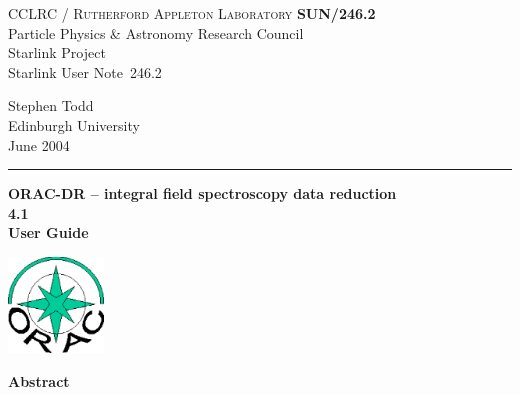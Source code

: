 \documentclass[twoside,11pt]{article}
\newcommand{\stardoccategory}  {Starlink User Note}
\newcommand{\stardocinitials}  {SUN}
\newcommand{\stardocnumber}    {246.2}
\newcommand{\stardocauthors}   {Stephen Todd \\
                                Edinburgh University}
\newcommand{\stardocdate}      {June 2004}
\newcommand{\stardoctitle}     {ORAC-DR -- integral field spectroscopy
  data reduction}
\newcommand{\stardocversion}   {4.1}
\newcommand{\stardocmanual}    {User Guide}
\newcommand{\stardocname}{\stardocinitials /\stardocnumber}
\newenvironment{latexonly}{}{}
\renewcommand{\_}{\texttt{\symbol{95}}}
\begin{document}
\setcounter{secnumdepth}{5}
\thispagestyle{empty}

\begin{latexonly}
   CCLRC / \textsc{Rutherford Appleton Laboratory} \hfill \textbf{\stardocname}\\
   {\large Particle Physics \& Astronomy Research Council}\\
   {\large Starlink Project\\ }
   {\large \stardoccategory\ \stardocnumber}
   \begin{flushright}
   \stardocauthors\\
   \stardocdate
   \end{flushright}
   \vspace{-4mm}
   \rule{\textwidth}{0.5mm}
   \vspace{5mm}
   \begin{center}
   {\Huge\textbf{\stardoctitle \\ [2.5ex]}}
   {\LARGE\textbf{\stardocversion \\ [4ex]}}
   {\Huge\textbf{\stardocmanual}}
   \end{center}
   \vspace{5mm}

\begin{center}
\includegraphics[width=1.0in]{sun246_logo.eps}
\end{center}

   \vspace{10mm}
   \begin{center}
      {\Large\textbf{Abstract}}
   \end{center}
\end{latexonly}
\end{document}
